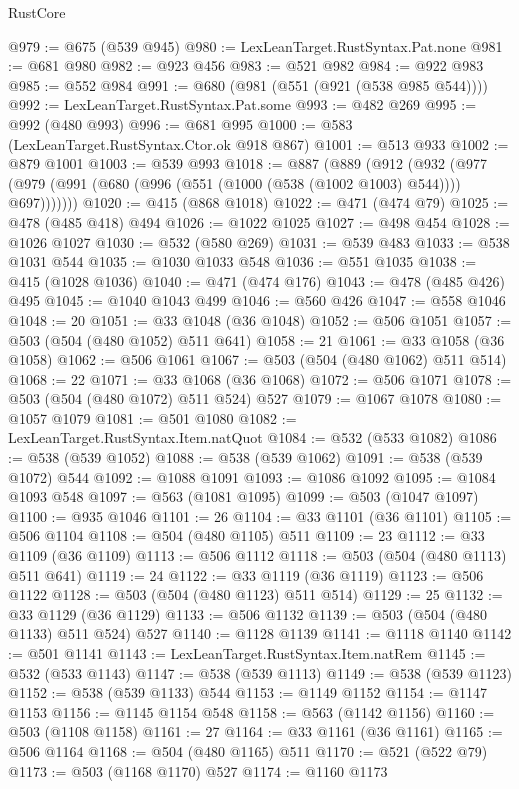 \begin{lexlean}{RustCore}
\begin{coremodule}
@979 := @675 (@539 @945)
@980 := LexLeanTarget.RustSyntax.Pat.none
@981 := @681 @980
@982 := @923 @456
@983 := @521 @982
@984 := @922 @983
@985 := @552 @984
@991 := @680 (@981 (@551 (@921 (@538 @985 @544))))
@992 := LexLeanTarget.RustSyntax.Pat.some
@993 := @482 @269
@995 := @992 (@480 @993)
@996 := @681 @995
@1000 := @583 (LexLeanTarget.RustSyntax.Ctor.ok @918 @867)
@1001 := @513 @933
@1002 := @879 @1001
@1003 := @539 @993
@1018 := @887
    (@889
      (@912
        (@932 (@977 (@979 (@991 (@680 (@996 (@551 (@1000 (@538 (@1002 @1003) @544)))) @697)))))))
@1020 := @415 (@868 @1018)
@1022 := @471 (@474 @79)
@1025 := @478 (@485 @418) @494
@1026 := @1022 @1025
@1027 := @498 @454
@1028 := @1026 @1027
@1030 := @532 (@580 @269)
@1031 := @539 @483
@1033 := @538 @1031 @544
@1035 := @1030 @1033 @548
@1036 := @551 @1035
@1038 := @415 (@1028 @1036)
@1040 := @471 (@474 @176)
@1043 := @478 (@485 @426) @495
@1045 := @1040 @1043 @499
@1046 := @560 @426
@1047 := @558 @1046
@1048 := 20
@1051 := @33 @1048 (@36 @1048)
@1052 := @506 @1051
@1057 := @503 (@504 (@480 @1052) @511 @641)
@1058 := 21
@1061 := @33 @1058 (@36 @1058)
@1062 := @506 @1061
@1067 := @503 (@504 (@480 @1062) @511 @514)
@1068 := 22
@1071 := @33 @1068 (@36 @1068)
@1072 := @506 @1071
@1078 := @503 (@504 (@480 @1072) @511 @524) @527
@1079 := @1067 @1078
@1080 := @1057 @1079
@1081 := @501 @1080
@1082 := LexLeanTarget.RustSyntax.Item.natQuot
@1084 := @532 (@533 @1082)
@1086 := @538 (@539 @1052)
@1088 := @538 (@539 @1062)
@1091 := @538 (@539 @1072) @544
@1092 := @1088 @1091
@1093 := @1086 @1092
@1095 := @1084 @1093 @548
@1097 := @563 (@1081 @1095)
@1099 := @503 (@1047 @1097)
@1100 := @935 @1046
@1101 := 26
@1104 := @33 @1101 (@36 @1101)
@1105 := @506 @1104
@1108 := @504 (@480 @1105) @511
@1109 := 23
@1112 := @33 @1109 (@36 @1109)
@1113 := @506 @1112
@1118 := @503 (@504 (@480 @1113) @511 @641)
@1119 := 24
@1122 := @33 @1119 (@36 @1119)
@1123 := @506 @1122
@1128 := @503 (@504 (@480 @1123) @511 @514)
@1129 := 25
@1132 := @33 @1129 (@36 @1129)
@1133 := @506 @1132
@1139 := @503 (@504 (@480 @1133) @511 @524) @527
@1140 := @1128 @1139
@1141 := @1118 @1140
@1142 := @501 @1141
@1143 := LexLeanTarget.RustSyntax.Item.natRem
@1145 := @532 (@533 @1143)
@1147 := @538 (@539 @1113)
@1149 := @538 (@539 @1123)
@1152 := @538 (@539 @1133) @544
@1153 := @1149 @1152
@1154 := @1147 @1153
@1156 := @1145 @1154 @548
@1158 := @563 (@1142 @1156)
@1160 := @503 (@1108 @1158)
@1161 := 27
@1164 := @33 @1161 (@36 @1161)
@1165 := @506 @1164
@1168 := @504 (@480 @1165) @511
@1170 := @521 (@522 @79)
@1173 := @503 (@1168 @1170) @527
@1174 := @1160 @1173

\end{coremodule}
\end{lexlean}
